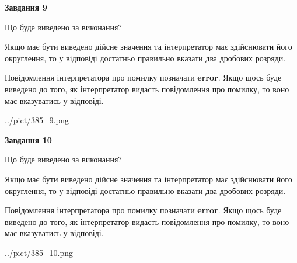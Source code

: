 \documentclass[12pt, ukrainian]{article}
\begin{document}
{\begin {Large}
{\begin {center}\textbf{Завдання 9}\end {center}}\par
Що буде виведено за виконання? \par

Якщо має бути виведено дійсне значення та інтерпретатор має здійснювати його округлення, 
то у відповіді достатньо правильно вказати два дробових розряди.

Повідомлення інтерпретатора про помилку позначати \textbf{error}.
Якщо щось буде виведено до того, як інтерпретатор видасть повідомлення про помилку, 
то воно має вказуватись у відповіді. \par

\begin{center}
	{../pict/385_9.png}
\end{center}
\newpage

{\begin {center}\textbf{Завдання 10}\end {center}}\par
Що буде виведено за виконання? \par

Якщо має бути виведено дійсне значення та інтерпретатор має здійснювати його округлення, 
то у відповіді достатньо правильно вказати два дробових розряди.

Повідомлення інтерпретатора про помилку позначати \textbf{error}.
Якщо щось буде виведено до того, як інтерпретатор видасть повідомлення про помилку, 
то воно має вказуватись у відповіді. \par

\begin{center}
	{../pict/385_10.png}
\end{center}
\newpage

\end {Large}}
\end{document}
